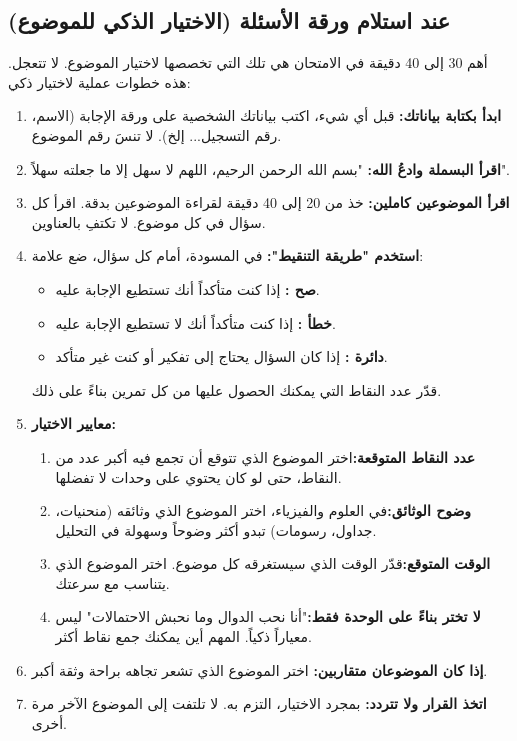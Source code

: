 \documentclass[12pt,a4paper]{book}
\begin{document}
	\subsection{عند استلام ورقة الأسئلة (الاختيار الذكي للموضوع)}
	أهم 30 إلى 40 دقيقة في الامتحان هي تلك التي تخصصها لاختيار الموضوع. لا تتعجل. هذه خطوات عملية لاختيار ذكي:
	
	\begin{enumerate}
		\item \textbf{ابدأ بكتابة بياناتك:} قبل أي شيء، اكتب بياناتك الشخصية على ورقة الإجابة (الاسم، رقم التسجيل... إلخ). لا تنسَ رقم الموضوع.
		\item \textbf{اقرأ البسملة وادعُ الله:} "بسم الله الرحمن الرحيم، اللهم لا سهل إلا ما جعلته سهلاً".
		\item \textbf{اقرأ الموضوعين كاملين:} خذ من 20 إلى 40 دقيقة لقراءة الموضوعين بدقة. اقرأ كل سؤال في كل موضوع. لا تكتفِ بالعناوين.
		\item \textbf{استخدم "طريقة التنقيط":} في المسودة، أمام كل سؤال، ضع علامة:
		\begin{itemize}
			\item \textbf{صح :} إذا كنت متأكداً أنك تستطيع الإجابة عليه.
			\item \textbf{خطأ :} إذا كنت متأكداً أنك لا تستطيع الإجابة عليه.
			\item \textbf{دائرة :} إذا كان السؤال يحتاج إلى تفكير أو كنت غير متأكد.
		\end{itemize}
		قدّر عدد النقاط التي يمكنك الحصول عليها من كل تمرين بناءً على ذلك.
		\item \textbf{معايير الاختيار:}
		\begin{enumerate}
			\item \textbf{عدد النقاط المتوقعة:}\newline اختر الموضوع الذي تتوقع أن تجمع فيه أكبر عدد من النقاط، حتى لو كان يحتوي على وحدات لا تفضلها.
			\item \textbf{وضوح الوثائق:}\newline في العلوم والفيزياء، اختر الموضوع الذي وثائقه (منحنيات، جداول، رسومات) تبدو أكثر وضوحاً وسهولة في التحليل.
			\item \textbf{الوقت المتوقع:}\newline قدّر الوقت الذي سيستغرقه كل موضوع. اختر الموضوع الذي يتناسب مع سرعتك.
			\item \textbf{لا تختر بناءً على الوحدة فقط:}\newline "أنا نحب الدوال وما نحبش الاحتمالات" ليس معياراً ذكياً. المهم أين يمكنك جمع نقاط أكثر.
		\end{enumerate}
		\item \textbf{إذا كان الموضوعان متقاربين:} اختر الموضوع الذي تشعر تجاهه براحة وثقة أكبر.
		\item \textbf{اتخذ القرار ولا تتردد:} بمجرد الاختيار، التزم به. لا تلتفت إلى الموضوع الآخر مرة أخرى.
	\end{enumerate}
	
\end{document}
